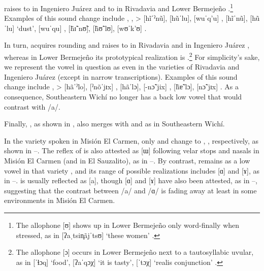  raises to  in Ingeniero Juárez \citep[362]{LCB15} and to  in Rivadavia \citep[49]{JT09-th} and Lower Bermejeño \citep[41]{VN14}.\footnote{The allophone [ʊ] shows up in Lower Bermejeño only word-finally when stressed, as in [ʔaˌtsin̥ãjˈtsʊ] `these women' \citep[41]{VN14}.} Examples of this sound change include , ,  >  [hĩˈˀnũ],  [hũˈlu],  [wuˈq’u] \citep[66, 161]{VN14},  [hĩˈnũ],  [hũˈlu] `dust',  [wuˈqu] \citep[25, 217–218]{JT09-th},  [h̃ɪ̃ˈnʊ̃],  [h̃ʊ̃ˈlʊ],  [wʊˈk’ʊ] \citep[364, 367]{LCB15}.

In turn,  acquires rounding and raises to  in Rivadavia \citep[77]{JT09-cap} and in Ingeniero Juárez \citep[362]{LCB15}, whereas in Lower Bermejeño its prototypical realization is  \citep[41]{VN14}.\footnote{The allophone [ɔ] occurs in Lower Bermejeño next to a tautosyllabic uvular, as in [ˈɬɔq] `food', [ʔaˈqɔχ] `it is tasty', [ˈtɔχ] `realis conjunction' \citep[41]{VN14}.} For simplicity’s sake, we represent the vowel in question as  even in the varieties of Rivadavia and Ingeniero Juárez (except in narrow transcriptions). Examples of this sound change include ,  >  [hãˈˀlo],  [ˀnõˈjɪx] \citep[66, 110]{VN14},  [hãˈlɔ],  [\mbox{-}nɔ̃ˈjix] \citep[68, 83]{JT09-th},  [h̃ɐ̃ˈlɔ],  [nɔ̃ˈjɪx] \citep[367, 372]{LCB15}. As a consequence, Southeastern Wichí no longer has a back low vowel that would contrast with /a/.

Finally, , as shown in , also merges with  and  as  in Southeastern Wichí.

In the variety spoken in Misión El Carmen, only  and  change to , , respectively, as shown in –. The reflex of  is also attested as [ɯ] following velar stops and nasals in Misión El Carmen (and in El Sauzalito), as in –. By contrast,  remains as a low vowel in that variety \citep[135–136]{MC09}, and its range of possible realizations includes [ɑ] and [ɤ], as in –.  is usually reflected as [a], though [ɑ] and [ɤ] have also been attested, as in –, suggesting that the contrast between /a/ and /ɑ/ is fading away at least in some environments in Misión El Carmen.

